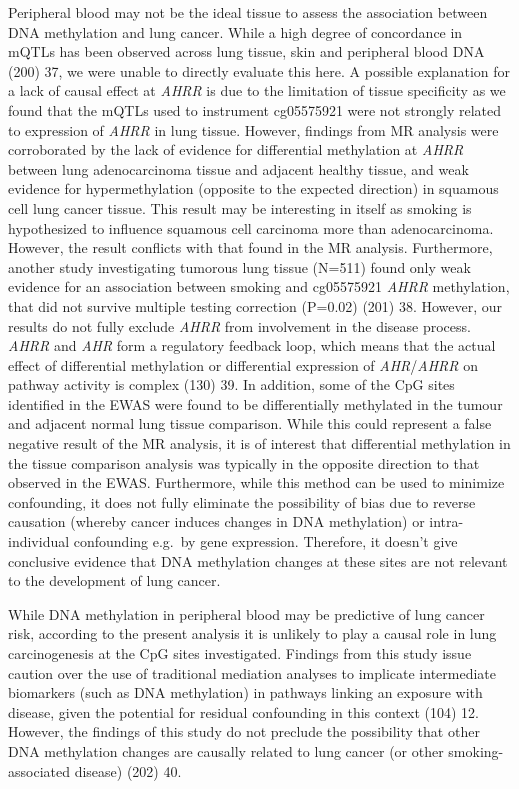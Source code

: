 \documentclass[11pt,oneside]{bristolthesis}
\begin{document}
Peripheral blood may not be the ideal tissue to assess the association between DNA methylation and lung cancer. While a high degree of concordance in mQTLs has been observed across lung tissue, skin and peripheral blood DNA (200) 37, we were unable to directly evaluate this here. A possible explanation for a lack of causal effect at \emph{AHRR} is due to the limitation of tissue specificity as we found that the mQTLs used to instrument cg05575921 were not strongly related to expression of \emph{AHRR} in lung tissue. However, findings from MR analysis were corroborated by the lack of evidence for differential methylation at \emph{AHRR} between lung adenocarcinoma tissue and adjacent healthy tissue, and weak evidence for hypermethylation (opposite to the expected direction) in squamous cell lung cancer tissue. This result may be interesting in itself as smoking is hypothesized to influence squamous cell carcinoma more than adenocarcinoma. However, the result conflicts with that found in the MR analysis. Furthermore, another study investigating tumorous lung tissue (N=511) found only weak evidence for an association between smoking and cg05575921 \emph{AHRR} methylation, that did not survive multiple testing correction (P=0.02) (201) 38. However, our results do not fully exclude \emph{AHRR} from involvement in the disease process. \emph{AHRR} and \emph{AHR} form a regulatory feedback loop, which means that the actual effect of differential methylation or differential expression of \emph{AHR}/\emph{AHRR} on pathway activity is complex (130) 39. In addition, some of the CpG sites identified in the EWAS were found to be differentially methylated in the tumour and adjacent normal lung tissue comparison. While this could represent a false negative result of the MR analysis, it is of interest that differential methylation in the tissue comparison analysis was typically in the opposite direction to that observed in the EWAS. Furthermore, while this method can be used to minimize confounding, it does not fully eliminate the possibility of bias due to reverse causation (whereby cancer induces changes in DNA methylation) or intra-individual confounding e.g.~by gene expression. Therefore, it doesn't give conclusive evidence that DNA methylation changes at these sites are not relevant to the development of lung cancer.

While DNA methylation in peripheral blood may be predictive of lung cancer risk, according to the present analysis it is unlikely to play a causal role in lung carcinogenesis at the CpG sites investigated. Findings from this study issue caution over the use of traditional mediation analyses to implicate intermediate biomarkers (such as DNA methylation) in pathways linking an exposure with disease, given the potential for residual confounding in this context (104) 12. However, the findings of this study do not preclude the possibility that other DNA methylation changes are causally related to lung cancer (or other smoking-associated disease) (202) 40.
\end{document}
